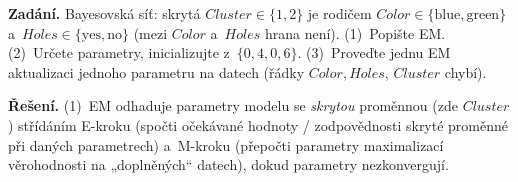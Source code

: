 \begin{priklad}
\par
\textbf{Zadání.} Bayesovská síť: skrytá $\mathit{Cluster}\in\{1,2\}$ je rodičem $\mathit{Color}\in\{\text{blue},\text{green}\}$ a~$\mathit{Holes}\in\{\text{yes},\text{no}\}$ (mezi $\mathit{Color}$ a~$\mathit{Holes}$ hrana není). (1)~Popište EM. (2)~Určete parametry, inicializujte z~$\{0{,}4,0{,}6\}$. (3)~Proveďte jednu EM aktualizaci jednoho parametru na datech (řádky $\mathit{Color},\mathit{Holes}$, $\mathit{Cluster}$ chybí).

\smallskip
\textbf{Řešení.} (1)~EM odhaduje parametry modelu se \emph{skrytou} proměnnou (zde $\mathit{Cluster}$) střídáním E-kroku (spočti očekávané hodnoty / zodpovědnosti skryté proměnné při daných parametrech) a~M-kroku (přepočti parametry maximalizací věrohodnosti na „doplněných`` datech), dokud parametry nezkonvergují.


\end{priklad}
